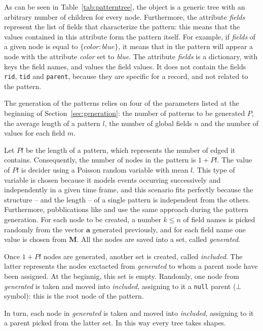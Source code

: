 \documentclass{acm_proc_article-sp-sigmod09}
\begin{document}
As can be seen in Table~\ref{tab:patterntree}, the object is a generic tree with an arbitrary number of children for every node. Furthermore, the attribute \emph{fields} represent the list of fields that characterize the pattern: this means that the values contained in this attribute form the pattern itself. For example, if \emph{fields} of a given node is equal to $ \{ color : blue \} $, it means that in the pattern will appear a node with the attribute \emph{color} set to \emph{blue}. The attribute \emph{fields} is a dictionary, with keys the field names, and values the field values. It does not contain the fields \texttt{rid}, \texttt{tid} and \texttt{parent}, because they are specific for a record, and not related to the pattern.

The generation of the patterns relies on four of the parameters listed at the beginning of Section~\ref{sec:generation}: the number of patterns to be generated $P$, the average length of a pattern $l$, the number of global fields $n$ and the number of values for each field $m$.

Let $Pl$ be the length of a pattern, which represents the number of edged it contains. Consequently, the number of nodes in the pattern is $1 + Pl$. The value of $Pl$ is decider using a Poisson random variable with mean $l$. This type of variable is chosen because it models events occurring successively and independently in a given time frame, and this scenario fits perfectly because the structure -- and the length -- of a single pattern is independent from the others. Furthermore, pubblications like \cite{agrawal1994fast} and \cite{ivancsy2006time} use the same approach during the pattern generation. For each node to be created, a number $k \le n$ of field names is picked randomly from the vector $\boldsymbol{a}$ generated previously, and for each field name one value is chosen from $\boldsymbol{M}$. All the nodes are saved into a set, called \emph{generated}.

Once $1 + Pl$ nodes are generated, another set is created, called \emph{included}. The latter represents the nodes exctacted from \emph{generated} to whom a parent node have been assigned. At the beginnig, this set is empty. Randomly, one node from \emph{generated} is taken and moved into \emph{included}, assigning to it a \texttt{null} parent ($\bot$ symbol): this is the root node of the pattern. 

In turn, each node in \emph{generated} is taken and moved into \emph{included}, assigning to it a parent picked from the latter set. In this way every tree takes shapes.
\end{document}
